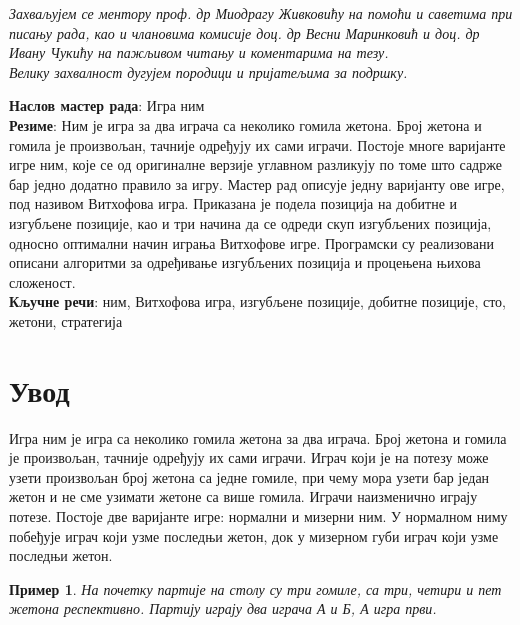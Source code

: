 \documentclass[a4paper]{article}
\newtheorem{example}{Пример}
\begin{document}


\clearpage
{\mbox{}\vspace{15em}
\flushright                       
\Large \emph{Захваљујем се ментору проф. др Миодрагу Живковићу на помоћи и саветима при писању рада, као и члановима комисије доц. др Весни Маринковић и доц. др Ивану Чукићу на пажљивом читању и коментарима на тезу. \\
Велику захвалност дугујем породици и пријатељима за подршку.} \par
\vfill
}

\clearpage
\textbf{Наслов мастер рада}: Игра ним\\

\textbf{Резиме}: Ним је игра за два играча са неколико гомила жетона. Број жетона и гомила је произвољан, тачније одређују их сами играчи. Постоје многе варијанте игре ним, које се од оригиналне верзије углавном разликују по томе што садрже бар једно додатно правило за игру. Мастер рад описује једну варијанту ове игре, под називом Витхофова игра. Приказана је подела позиција на добитне и изгубљене позиције, као и три начина да се одреди скуп изгубљених позиција, односно оптимални начин играња Витхофове игре. Програмски су реализовани описани алгоритми за одређивање изгубљених позиција и процењена њихова сложеност.\\

\textbf{Кључне речи}: ним, Витхофова игра, изгубљене позиције, добитне позиције, сто, жетони, стратегија

\clearpage

\tableofcontents

\newpage
{}

\section{Увод}
\label{sec:uvod}

Игра ним \cite{carls_buton} је игра са неколико гомила жетона за два играча. Број жетона и гомила је произвољан, тачније одређују их сами играчи. Играч који је на потезу може узети произвољан број жетона са једне гомиле, при чему мора узети бар један жетон и не сме узимати жетоне са више гомила. Играчи наизменично играју потезе. Постоје две варијанте игре: нормални и мизерни ним. У нормалном ниму побеђује играч који узме последњи жетон, док у мизерном губи играч који узме последњи жетон.

\begin{example}
На почетку партије на столу су три гомиле, са три, четири и пет жетона респективно. Партију играју два играча \textit{А} и \textit{Б}, \textit{А} игра први. 
\end{example}
\end{document}
